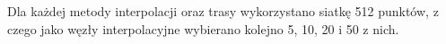\documentclass[a4paper,12pt]{article}
\begin{document}
  \begin{figure}[H]
    \centering
  \end{figure}
  \par Dla każdej metody interpolacji oraz trasy wykorzystano siatkę 512 punktów, z czego jako węzły interpolacyjne wybierano kolejno 5, 10, 20 i 50 z nich.
\end{document}
